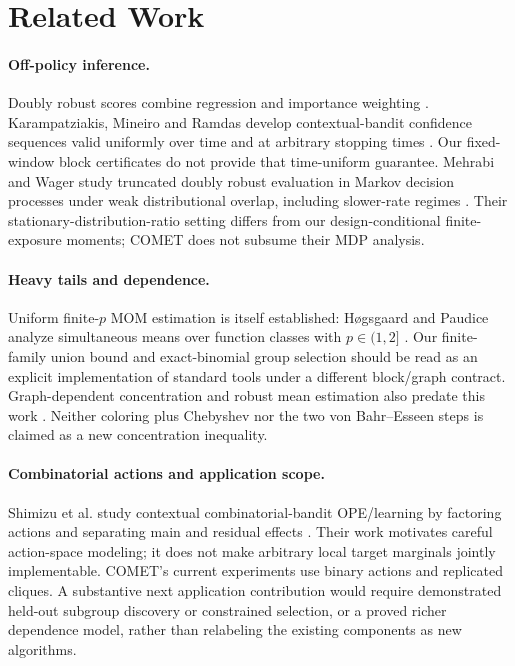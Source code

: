 \section{Related Work}
\label{sec:related}
\paragraph{Off-policy inference.}
Doubly robust scores combine regression and importance weighting \citep{dudik2011doubly,jiang2016doubly}. Karampatziakis, Mineiro and Ramdas develop contextual-bandit confidence sequences valid uniformly over time and at arbitrary stopping times \citep{karampatziakis2021sequences}. Our fixed-window block certificates do not provide that time-uniform guarantee. Mehrabi and Wager study truncated doubly robust evaluation in Markov decision processes under weak distributional overlap, including slower-rate regimes \citep{mehrabi2024weak}. Their stationary-distribution-ratio setting differs from our design-conditional finite-exposure moments; COMET does not subsume their MDP analysis.

\paragraph{Heavy tails and dependence.}
Uniform finite-$p$ MOM estimation is itself established: H{\o}gsgaard and Paudice analyze simultaneous means over function classes with $p\in(1,2]$ \citep{hogsgaard2025uniform}. Our finite-family union bound and exact-binomial group selection should be read as an explicit implementation of standard tools under a different block/graph contract. Graph-dependent concentration and robust mean estimation also predate this work \citep{janson2004large,lugosi2019mean}. Neither coloring plus Chebyshev nor the two von Bahr--Esseen steps is claimed as a new concentration inequality.

\paragraph{Combinatorial actions and application scope.}
Shimizu et al. study contextual combinatorial-bandit OPE/learning by factoring actions and separating main and residual effects \citep{shimizu2024combinatorial}. Their work motivates careful action-space modeling; it does not make arbitrary local target marginals jointly implementable. COMET's current experiments use binary actions and replicated cliques. A substantive next application contribution would require demonstrated held-out subgroup discovery or constrained selection, or a proved richer dependence model, rather than relabeling the existing components as new algorithms.

